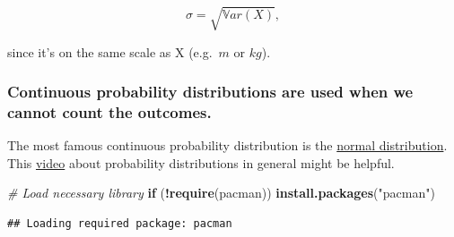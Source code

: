 \documentclass[
]{book}
\newenvironment{Shaded}{\begin{snugshade}}{\end{snugshade}}
\newcommand{\CommentTok}[1]{\textcolor[rgb]{0.56,0.35,0.01}{\textit{#1}}}
\newcommand{\ControlFlowTok}[1]{\textcolor[rgb]{0.13,0.29,0.53}{\textbf{#1}}}
\newcommand{\FunctionTok}[1]{\textcolor[rgb]{0.13,0.29,0.53}{\textbf{#1}}}
\newcommand{\NormalTok}[1]{#1}
\newcommand{\SpecialCharTok}[1]{\textcolor[rgb]{0.81,0.36,0.00}{\textbf{#1}}}
\newcommand{\StringTok}[1]{\textcolor[rgb]{0.31,0.60,0.02}{#1}}
\begin{document}
\[\sigma = \sqrt{\mathbb{V}ar(X)},\]

since it's on the same scale as X (e.g.~\(m\) or \(kg\)).

\subsubsection{Continuous probability distributions are used when we cannot count the outcomes.}\label{continuous_probability_distributions}

The most famous continuous probability distribution is the
\href{https://en.wikipedia.org/wiki/Normal_distribution}{normal distribution}.
This \href{https://www.youtube.com/watch?v=k5sbE1_MDwU&ab_channel=VeryNormal}{video}
about probability distributions in general might be helpful.

\begin{Shaded}
\begin{Highlighting}[]
\CommentTok{\# Load necessary library}
\ControlFlowTok{if}\NormalTok{ (}\SpecialCharTok{!}\FunctionTok{require}\NormalTok{(pacman)) }\FunctionTok{install.packages}\NormalTok{(}\StringTok{"pacman"}\NormalTok{)}
\end{Highlighting}
\end{Shaded}

\begin{verbatim}
## Loading required package: pacman
\end{verbatim}
\end{document}
